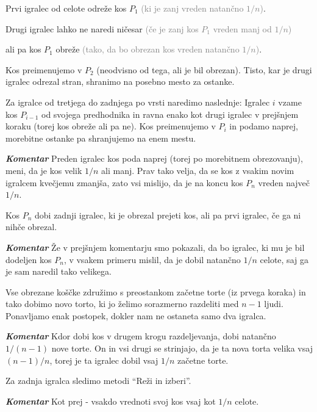 \documentclass[a4paper,12pt]{article}
\begin{document}
\begin{protokol}

\item Prvi igralec od celote odreže kos $P_1$ \textcolor{gray}{(ki je zanj vreden natančno $1/n$)}.

\item Drugi igralec lahko ne naredi ničesar \textcolor{gray}{(če je zanj kos $P_1$ vreden manj od $1/n$)}

ali pa kos $P_1$ obreže \textcolor{gray}{(tako, da bo obrezan kos vreden natančno $1/n$)}.

Kos preimenujemo v $P_2$ (neodvisno od tega, ali je bil obrezan). Tisto, kar je drugi igralec odrezal stran, shranimo na posebno mesto za ostanke.

\item Za igralce od tretjega do zadnjega po vrsti naredimo naslednje: Igralec $i$ vzame kos $P_{i-1}$ od svojega predhodnika in ravna enako kot drugi igralec v prejšnjem koraku (torej kos obreže ali pa ne). Kos preimenujemo v $P_i$ in podamo naprej, morebitne ostanke pa shranjujemo na enem mestu.

\item [\textbf{\em Komentar}] Preden igralec kos poda naprej (torej po morebitnem obrezovanju), meni, da je kos velik $1/n$ ali manj. Prav tako velja, da se kos z vsakim novim igralcem kvečjemu zmanjša, zato vsi mislijo, da je na koncu kos $P_n$ vreden največ $1/n$.

\item Kos $P_n$ dobi zadnji igralec, ki je obrezal prejeti kos, ali pa prvi igralec, če ga ni nihče obrezal.

\item [\textbf{\em Komentar}] Že v prejšnjem komentarju smo pokazali, da bo igralec, ki mu je bil dodeljen kos $P_n$, v vsakem primeru mislil, da je dobil natančno $1/n$ celote, saj ga je sam naredil tako velikega. %

\item Vse obrezane koščke združimo s preostankom začetne torte (iz prvega koraka) in tako dobimo novo torto, ki jo želimo sorazmerno razdeliti med $n - 1$ ljudi. Ponavljamo enak postopek, dokler nam ne ostaneta samo dva igralca.

\item [\textbf{\em Komentar}] Kdor dobi kos v drugem krogu razdeljevanja, dobi natančno $1/(n - 1)$ nove torte. On in vsi drugi se strinjajo, da je ta nova torta velika vsaj $(n - 1)/n$, torej je ta igralec dobil vsaj $1/n$ začetne torte.

\item Za zadnja igralca sledimo metodi ``Reži in izberi''.

\item [\textbf{\em Komentar}] Kot prej - vsakdo vrednoti svoj kos vsaj kot $1/n$ celote.

\end{protokol}
\end{document}
